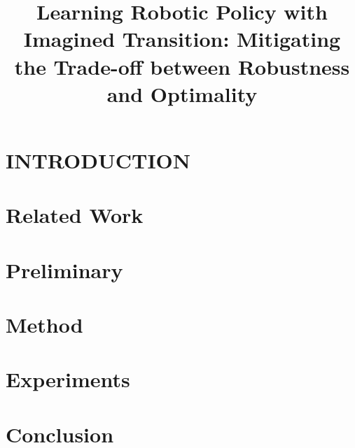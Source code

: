 \documentclass[letterpaper, 10 pt, conference]{ieeeconf}  %
\title{\LARGE \bf
Learning Robotic Policy with Imagined Transition: Mitigating the Trade-off between Robustness and Optimality
}
\begin{document}
\maketitle
\thispagestyle{empty}
\pagestyle{empty}


\begin{abstract}


\end{abstract}


\section{INTRODUCTION}


\section{Related Work}


\section{Preliminary}


\section{Method}


\section{Experiments}


\section{Conclusion}







\addtolength{\textheight}{-12cm} 
\end{document}
